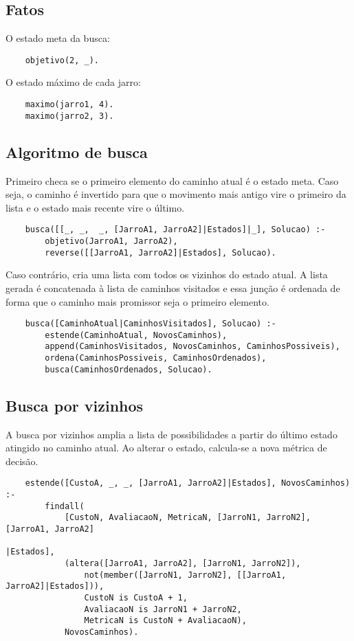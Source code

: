 \documentclass[12pt,a4paper]{article}
\begin{document}
\subsection{Fatos}

O estado meta da busca:
\begin{verbatim}
	objetivo(2, _).
\end{verbatim}

\noindent
O estado máximo de cada jarro:
\begin{verbatim}
	maximo(jarro1, 4).
	maximo(jarro2, 3).
\end{verbatim}

\subsection{Algoritmo de busca}

Primeiro checa se o primeiro elemento do caminho atual é o estado meta. Caso seja, o caminho é invertido para que o movimento mais antigo vire o primeiro da lista e o estado mais recente vire o último.

\begin{verbatim}
	busca([[_, _,  _, [JarroA1, JarroA2]|Estados]|_], Solucao) :-
	    objetivo(JarroA1, JarroA2),
	    reverse([[JarroA1, JarroA2]|Estados], Solucao).
\end{verbatim}

\noindent
Caso contrário, cria uma lista com todos os vizinhos do estado atual. A lista gerada é concatenada à lista de caminhos visitados e essa junção é ordenada de forma que o caminho mais promissor seja o primeiro elemento. 
\begin{verbatim}
	busca([CaminhoAtual|CaminhosVisitados], Solucao) :-
	    estende(CaminhoAtual, NovosCaminhos),
	    append(CaminhosVisitados, NovosCaminhos, CaminhosPossiveis),
	    ordena(CaminhosPossiveis, CaminhosOrdenados),
	    busca(CaminhosOrdenados, Solucao).
\end{verbatim}

\subsection{Busca por vizinhos}

A busca por vizinhos amplia a lista de possibilidades a partir do último estado atingido no caminho atual. Ao alterar o estado, calcula-se a nova métrica de decisão.
\begin{verbatim}
	estende([CustoA, _, _, [JarroA1, JarroA2]|Estados], NovosCaminhos) :-
	    findall(
	        [CustoN, AvaliacaoN, MetricaN, [JarroN1, JarroN2], [JarroA1, JarroA2]
	                                                                     |Estados],
	        (altera([JarroA1, JarroA2], [JarroN1, JarroN2]),
	            not(member([JarroN1, JarroN2], [[JarroA1, JarroA2]|Estados])),
	            CustoN is CustoA + 1,
	            AvaliacaoN is JarroN1 + JarroN2,
	            MetricaN is CustoN + AvaliacaoN),
	        NovosCaminhos).
\end{verbatim}
\end{document}
